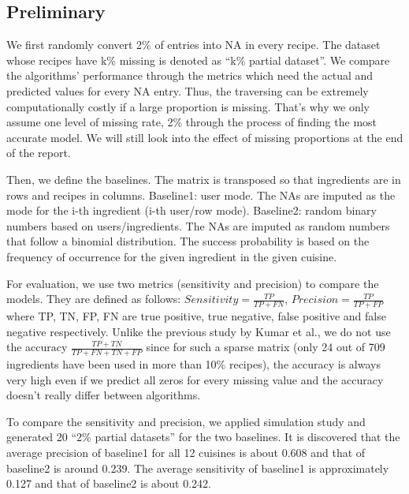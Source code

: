 \documentclass{article}
\begin{document}
\subsection{Preliminary}
We first randomly convert 2\% of entries into NA in every recipe. The dataset whose recipes have k\% missing is denoted as “k\% partial dataset”. We compare the algorithms’ performance through the metrics which need the actual and predicted values for every NA entry. Thus, the traversing can be extremely computationally costly if a large proportion is missing. That’s why we only assume one level of missing rate, 2\% through the process of finding the most accurate model. We will still look into the effect of missing proportions at the end of the report.

Then, we define the baselines. The matrix is transposed so that ingredients are in rows and recipes in columns. Baseline1: user mode. The NAs are imputed as the mode for the i-th ingredient (i-th user/row mode). Baseline2: random binary numbers based on users/ingredients. The NAs are imputed as random numbers that follow a binomial distribution. The success probability is based on the frequency of occurrence for the given ingredient in the given cuisine.

For evaluation, we use two metrics (sensitivity and precision) to compare the models. They are defined as follows:
$Sensitivity = \frac{TP}{TP+FN}$, $Precision = \frac{TP}{TP+FP}$
where TP, TN, FP, FN are true positive, true negative, false positive and false negative respectively. Unlike the previous study by Kumar et al.\cite{metrics}, we do not use the accuracy $\frac{TP+TN}{TP+FN+TN+FP}$ since for such a sparse matrix (only 24 out of 709 ingredients have been used in more than 10\% recipes), the accuracy is always very high even if we predict all zeros for every missing value and the accuracy doesn’t really differ between algorithms.

To compare the sensitivity and precision, we applied simulation study and generated 20 “2\% partial datasets” for the two baselines. It is discovered that the average precision of baseline1 for all 12 cuisines is about 0.608 and that of baseline2 is around 0.239. The average sensitivity of baseline1 is approximately 0.127 and that of baseline2 is about 0.242.
\end{document}
